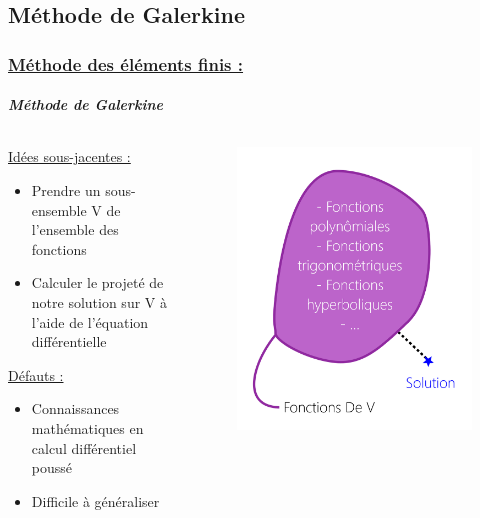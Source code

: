 \documentclass[10pt]{beamer}
\begin{document}
	\subsection{M\'ethode de Galerkine}
	\begin{frame}
		\frametitle{\uline{M\'ethode des \'el\'ements finis :}}
		\framesubtitle{\textit{M\'ethode de Galerkine}}
		\begin{columns}[t]
  			\begin{column}{5cm} 
				\begin{block}{}
  					\uline{Id\'ees sous-jacentes :}
   					\begin{itemize}
						\item Prendre un sous-ensemble V de l'ensemble des fonctions
						\item Calculer le projeté de notre solution sur V à l'aide de l'\'equation diff\'erentielle 
					\end{itemize}
					\uline{D\'efauts :}
					\begin{itemize}
						\item Connaissances math\'ematiques en calcul diff\'erentiel pouss\'e
						\item Difficile \`a g\'en\'eraliser
					\end{itemize}
				\end{block}
  			\end{column}
 			\begin{column}{5cm}
 				\begin{figure}
   					\includegraphics[scale = 0.58]{Images/Galerkine.png}
				\end{figure}
			 \end{column}
 		\end{columns}
	\end{frame}
\end{document}
